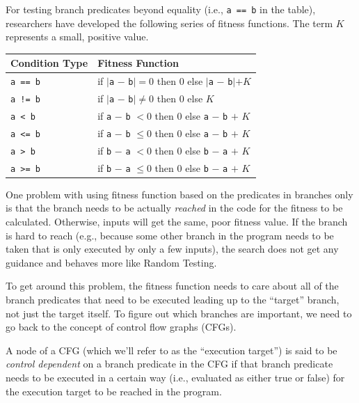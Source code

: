 For testing branch predicates beyond equality (i.e., {\tt a == b} in the table),
researchers have developed the following series of fitness functions. The term
$K$ represents a small, positive value.

\begin{center}
    \begin{tabular}{ll}
        \toprule
        {\bf Condition Type} & {\bf Fitness Function} \\
        \midrule
        {\tt a == b} & if $|${\tt a} $-$ {\tt b}$| = 0$ then $0$ else $|${\tt a}
        $-$ {\tt b}$| + K$ \\
        {\tt a != b} & if $|${\tt a} $-$ {\tt b}$| \neq 0$ then $0$ else $K$ \\
        {\tt a < b}  & if {\tt a} $-$ {\tt b} $< 0$ then $0$ else {\tt a} $-$
        {\tt b} $+$ $K$ \\
        {\tt a <= b} & if {\tt a} $-$ {\tt b} $\leq 0$ then $0$ else {\tt a} $-$
        {\tt b} $+$ $K$ \\
        {\tt a > b}  & if {\tt b} $-$ {\tt a} $< 0$ then $0$ else {\tt b} $-$
        {\tt a} $+$ $K$ \\
        {\tt a >= b} & if {\tt b} $-$ {\tt a} $\leq 0$ then $0$ else {\tt b} $-$
        {\tt a} $+$ $K$ \\
        \bottomrule
    \end{tabular}
\end{center}    
    
One problem with using fitness function based on the predicates in branches only
is that the branch needs to be actually {\it reached} in the code for the
fitness to be calculated. Otherwise, inputs will get the same, poor fitness
value. If the branch is hard to reach (e.g., because some other branch in the
program needs to be taken that is only executed by only a few inputs), the
search does not get any guidance and behaves more like Random Testing.

To get around this problem, the fitness function needs to care about all of the
branch predicates that need to be executed leading up to the ``target'' branch,
not just the target itself. To figure out which branches are important, we need
to go back to the concept of control flow graphs (CFGs). 


A node of a CFG (which we'll refer to as the ``execution target'') is said to be
{\it control dependent} on a branch predicate in the CFG if that branch
predicate needs to be executed in a certain way (i.e., evaluated as either true
or false) for the execution target to be reached in the program. 

